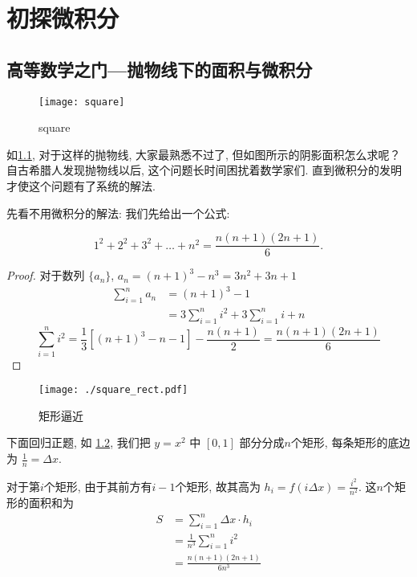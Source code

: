 \chapter{初探微积分}

\section{高等数学之门---抛物线下的面积与微积分}

\begin{figure}
  \begin{center}
    \texttt{[image: square]}
  \end{center}
  \caption{square}\label{fig:square}
\end{figure}

如\cref{fig:square}, 对于这样的抛物线, 大家最熟悉不过了, 但如图所示的阴影面积怎么求呢？
自古希腊人发现抛物线以后, 这个问题长时间困扰着数学家们.
直到微积分的发明才使这个问题有了系统的解法.

先看不用微积分的解法:
我们先给出一个公式:

\[
  1^{2}+2^{2}+3^{2}+\ldots + n^{2} = \frac{n(n+1)(2n+1)}{6}
.\]

\begin{proof}
  对于数列 $\{a_{n}\} $, $a_n = (n+1)^{3}- n ^{3} = 3n^{2}+3n+1$
  \begin{align}
    \sum_{i=1}^{n} a_n & = (n+1)^{3}-1                                     \\
    & = 3 \sum_{i=1}^{n} i^{2} + 3 \sum_{i=1}^{n} i + n
  \end{align}
  \begin{equation*}
    \sum_{i=1}^{n} i^{2} = \frac{1}{3} \left[(n+1)^{3} -n -1 \right]
    - \frac{n(n+1)}{2}  = \frac{n(n+1)(2n+1)}{6}
  \end{equation*}
\end{proof}

\begin{figure}
  \begin{center}
    \texttt{[image: ./square\_rect.pdf]}
  \end{center}
  \caption{矩形逼近} \label{fig:rect}
\end{figure}

下面回归正题,
如 \cref{fig:rect}, 我们把 $y=x^{2} $ 中 $[0, 1]$ 部分分成$n$个矩形,
每条矩形的底边为 $ \frac{1}{n} = \Delta x $.

对于第$i$个矩形, 由于其前方有$i-1$个矩形,
故其高为 $h_i = f(i \Delta x) = \frac{i^{2}}{n^{2} } $.
这$n$个矩形的面积和为
\begin{align*}
  S & = \sum_{i=1}^{n} \Delta x \cdot h_i  \\
  & = \frac{1}{n^3} \sum_{i=1}^{n} i^{2} \\
  & = \frac{n(n+1)(2n+1)}{6n^3 }
\end{align*}


